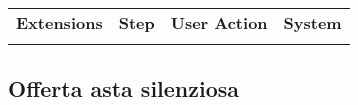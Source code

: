 \begin{table}[H]
\begin{tabularx}{\linewidth}{|l|p{40pt}|X|X|}
		\hline
		\multirow{1}{*}{\textbf{\sffamily Extensions}}     & \textbf{\sffamily Step}                                                           & \textbf{\sffamily User Action} & \textbf{\sffamily System} \\
		\cline{2-4}                                        &                                                                                   &                                &                           \\

		\hline
	\end{tabularx}
\end{table}

\newpage
\subsection{Offerta asta silenziosa}
